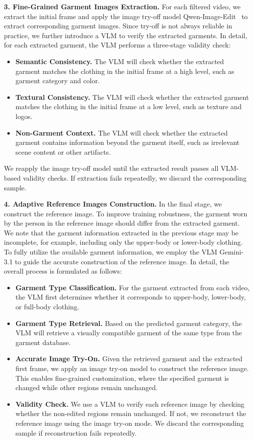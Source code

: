 \noindent
\textbf{3. Fine-Grained Garment Images Extraction.}
% 
For each filtered video, we extract the initial frame and apply the image try-off model Qwen-Image-Edit~\cite{wu2025qwen} to extract corresponding garment images.
Since try-off is not always reliable in practice, we further introduce a VLM to verify the extracted garments.
In detail, for each extracted garment, the VLM performs a three-stage validity check:
% 
\begin{itemize}
% 
\item \textbf{Semantic Consistency.} The VLM will check whether the extracted garment matches the clothing in the initial frame at a high level, such as garment category and color.
% 
\item \textbf{Textural Consistency.} The VLM will check whether the extracted garment matches the clothing in the initial frame at a low level, such as texture and logos.
% 
\item \textbf{Non-Garment Context.} The VLM will check whether the extracted garment contains information beyond the garment itself, such as irrelevant scene content or other artifacts.
\end{itemize}
% 
We reapply the image try-off model until the extracted result passes all VLM-based validity checks. If extraction fails repeatedly, we discard the corresponding sample.

\noindent
\textbf{4. Adaptive Reference Images Construction.}
% 
In the final stage, we construct the reference image. To improve training robustness, the garment worn by the person in the reference image should differ from the extracted garment.
% 
We note that the garment information extracted in the previous stage may be incomplete, for example, including only the upper-body or lower-body clothing.
To fully utilize the available garment information, we employ the VLM Gemini-3.1 to guide the accurate construction of the reference image. In detail, the overall process is formulated as follows:
\begin{itemize}
% 
\item \textbf{Garment Type Classification.} For the garment extracted from each video, the VLM first determines whether it corresponds to upper-body, lower-body, or full-body clothing.
% 
\item \textbf{Garment Type Retrieval.} Based on the predicted garment category, the VLM will retrieve a visually compatible garment of the same type from the garment database.
% 
\item \textbf{Accurate Image Try-On.} Given the retrieved garment and the extracted first frame, we apply an image try-on model to construct the reference image. This enables fine-grained customization, where the specified garment is changed while other regions remain unchanged.
% 
\item \textbf{Validity Check.} We use a VLM to verify each reference image by checking whether the non-edited regions remain unchanged. If not, we reconstruct the reference image using the image try-on mode. We discard the corresponding sample if reconstruction fails repeatedly.
\end{itemize}


